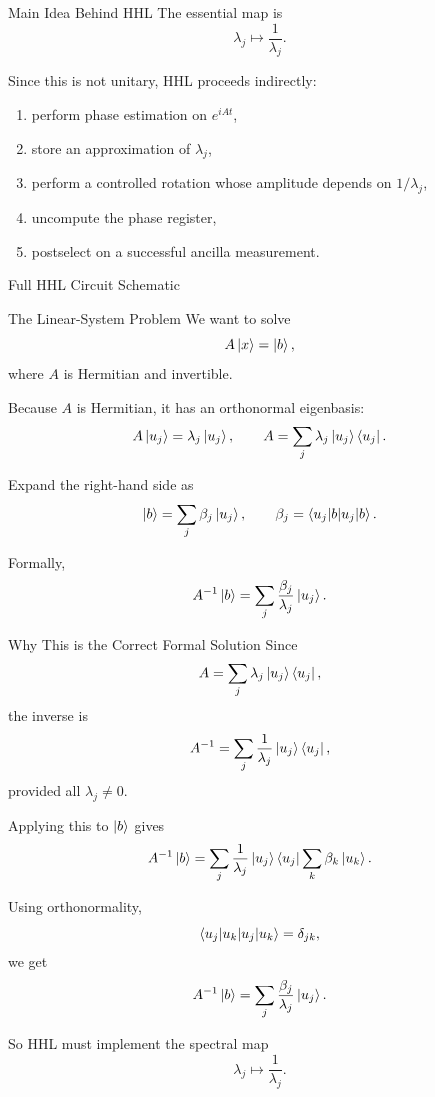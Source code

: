 \documentclass{beamer}
\begin{document}
\begin{frame}{Main Idea Behind HHL}
The essential map is
\[
\lambda_j \mapsto \frac{1}{\lambda_j}.
\]

Since this is not unitary, HHL proceeds indirectly:
\begin{enumerate}
    \item perform phase estimation on \(e^{iAt}\),
    \item store an approximation of \(\lambda_j\),
    \item perform a controlled rotation whose amplitude depends on \(1/\lambda_j\),
    \item uncompute the phase register,
    \item postselect on a successful ancilla measurement.
\end{enumerate}
\end{frame}

\begin{frame}{Full HHL Circuit Schematic}
\end{frame}


\begin{frame}{The Linear-System Problem}
We want to solve
\[
A\ket{x}=\ket{b},
\]
where \(A\) is Hermitian and invertible.

Because \(A\) is Hermitian, it has an orthonormal eigenbasis:
\[
A\ket{u_j}=\lambda_j \ket{u_j},
\qquad
A=\sum_j \lambda_j \ket{u_j}\bra{u_j}.
\]

Expand the right-hand side as
\[
\ket{b}=\sum_j \beta_j \ket{u_j},
\qquad
\beta_j=\braket{u_j|b}.
\]

Formally,
\[
A^{-1}\ket{b}=\sum_j \frac{\beta_j}{\lambda_j}\ket{u_j}.
\]
\end{frame}

\begin{frame}{Why This is the Correct Formal Solution}
Since
\[
A=\sum_j \lambda_j \ket{u_j}\bra{u_j},
\]
the inverse is
\[
A^{-1}=\sum_j \frac{1}{\lambda_j}\ket{u_j}\bra{u_j},
\]
provided all \(\lambda_j\neq 0\).

Applying this to \(\ket{b}\) gives
\[
A^{-1}\ket{b}
=
\sum_j \frac{1}{\lambda_j}\ket{u_j}\bra{u_j}
\sum_k \beta_k \ket{u_k}.
\]

Using orthonormality,
\[
\braket{u_j|u_k}=\delta_{jk},
\]
we get
\[
A^{-1}\ket{b}
=
\sum_j \frac{\beta_j}{\lambda_j}\ket{u_j}.
\]

So HHL must implement the spectral map
\[
\lambda_j \longmapsto \frac{1}{\lambda_j}.
\]
\end{frame}
\end{document}

